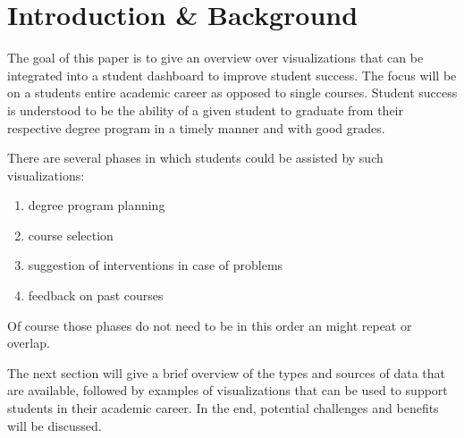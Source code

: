\section{Introduction \& Background}
\label{sec:introcution}

The goal of this paper is to give an overview over visualizations that can be integrated into a student dashboard to improve student success.
The focus will be on a students entire academic career as opposed to single courses.
Student success is understood to be the ability of a given student to graduate from their respective degree program in a timely manner and with good grades.

There are several phases in which students could be assisted by such visualizations:

\begin{enumerate}
    \item degree program planning
    \item course selection
    \item suggestion of interventions in case of problems
    \item feedback on past courses
\end{enumerate}

Of course those phases do not need to be in this order an might repeat or overlap.

The next section will give a brief overview of the types and sources of data that are available, followed by examples of visualizations that can be used to support students in their academic career.
In the end, potential challenges and benefits will be discussed.
